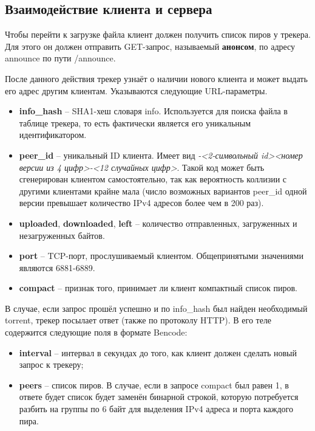 \subsection{Взаимодействие клиента и сервера}
Чтобы перейти к загрузке файла клиент должен получить список пиров у трекера. Для этого он должен отправить GET-запрос, называемый \textbf{анонсом}, по адресу announce по пути /announce. 

После данного действия трекер узнаёт о наличии нового клиента и может выдать его адрес другим клиентам. Указываются следующие URL-параметры.

\begin{itemize}
	\item \textbf{info\_hash} -- SHA1-хеш словаря info. Используется для поиска файла в таблице трекера, то есть фактически является его уникальным идентификатором.
	
	\item \textbf{peer\_id} -- уникальный ID клиента. Имеет вид \textit{-<2-символьный id><номер версии из 4 цифр>-<12 случайных цифр>}. Такой код может быть сгенерирован клиентом самостоятельно, так как вероятность коллизии с другими клиентами крайне мала (число возможных вариантов peer\_id одной версии превышает количество IPv4 адресов более чем в 200 раз).
	
	\item \textbf{uploaded}, \textbf{downloaded}, \textbf{left} -- количество отправленных, загруженных и незагруженных байтов.
	
	\item \textbf{port} -- TCP-порт, прослушиваемый клиентом. Общепринятыми значениями являются 6881-6889.
	
	\item \textbf{compact} -- признак того, принимает ли клиент компактный список пиров. \\
	
\end{itemize}

В случае, если запрос прошёл успешно и по info\_hash был найден необходимый torrent, трекер посылает ответ (также по протоколу HTTP). В его теле содержится следующие поля в формате Bencode:
\begin{itemize}
	\item \textbf{interval} -- интервал в секундах до того, как клиент должен сделать новый запрос к трекеру;
	
	\item \textbf{peers} -- список пиров. В случае, если в запросе compact был равен 1, в ответе будет список будет заменён бинарной строкой, которую потребуется разбить на группы по 6 байт для выделения IPv4 адреса и порта каждого пира. \\
\end{itemize}

